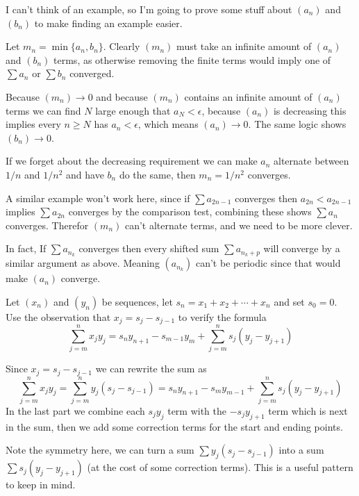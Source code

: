 \begin{solution}
  I can't think of an example, so I'm going to prove some stuff about $(a_n)$ and $(b_n)$ to make finding an example easier.

  Let $m_n = \min\{a_n, b_n\}$.
  Clearly $(m_n)$ must take an infinite amount of $(a_n)$ and $(b_n)$ terms, as otherwise removing the finite terms would imply one of $\sum a_n$ or $\sum b_n$ converged.

  Because $(m_n) \to 0$ and because $(m_n)$ contains an infinite amount of $(a_n)$ terms we can find $N$ large enough that $a_N < \epsilon$, because $(a_n)$ is decreasing this implies every $n \ge N$ has $a_n < \epsilon$, which means $(a_n) \to 0$. The same logic shows $(b_n) \to 0$.

  If we forget about the decreasing requirement we can make $a_n$ alternate between $1/n$ and $1/n^2$ and have $b_n$ do the same, then $m_n = 1/n^2$ converges.

  A similar example won't work here, since if $\sum a_{2n-1}$ converges then $a_{2n} < a_{2n-1}$ implies $\sum a_{2n}$ converges by the comparison test, combining these shows $\sum a_n$ converges. Therefor $(m_n)$ can't alternate terms, and we need to be more clever.

  In fact, If $\sum a_{n_k}$ converges then every shifted sum $\sum a_{n_k+p}$ will converge by a similar argument as above. Meaning $\left(a_{n_k}\right)$ can't be periodic since that would make $(a_n)$ converge.

  \TODO

\end{solution}

\begin{exercise}
  Let $\left(x_{n}\right)$ and $\left(y_{n}\right)$ be sequences, let $s_{n}=x_{1}+x_{2}+\cdots+x_{n}$ and set $s_{0}=0 .$ Use the observation that $x_{j}=s_{j}-s_{j-1}$ to verify the formula
  $$
  \sum_{j=m}^{n} x_{j} y_{j}=s_{n} y_{n+1}-s_{m-1} y_{m}+\sum_{j=m}^{n} s_{j}\left(y_{j}-y_{j+1}\right)
  $$
\end{exercise}

\begin{solution}
  Since $x_j = s_j - s_{j-1}$ we can rewrite the sum as
  $$
  \sum_{j=m}^n x_jy_j
  = \sum_{j=m}^n y_j(s_j - s_{j-1})
  = s_ny_{n+1} - s_my_{m-1} + \sum_{j=m}^n s_j(y_j - y_{j+1})
  $$
  In the last part we combine each $s_jy_j$ term with the $-s_{j}y_{j+1}$ term which is next in the sum, then we add some correction terms for the start and ending points.

  Note the symmetry here, we can turn a sum $\sum y_j(s_j-s_{j-1})$ into a sum $\sum s_j(y_j-y_{j+1})$ (at the cost of some correction terms). This is a useful pattern to keep in mind.
\end{solution}

